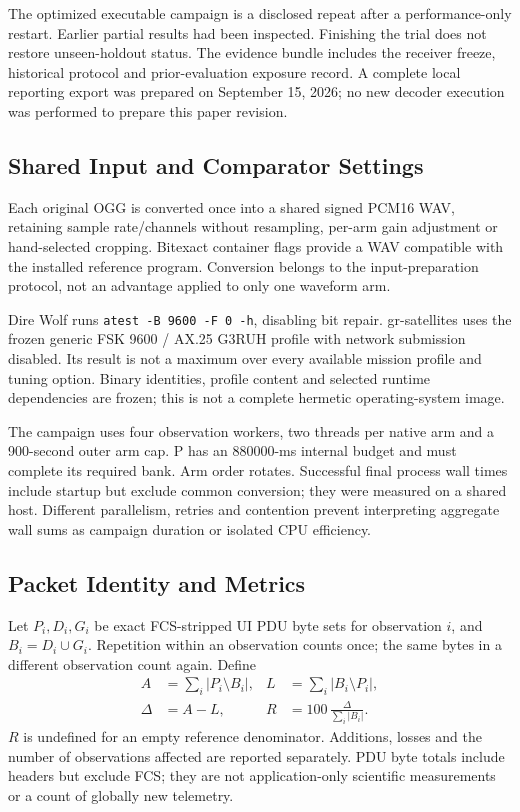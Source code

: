 \documentclass[journal]{IEEEtran}
\newcommand{\code}[1]{\texttt{#1}}
\begin{document}
The optimized executable campaign is a disclosed repeat after a performance-only restart. Earlier partial results had been inspected. Finishing the trial does not restore unseen-holdout status. The evidence bundle includes the receiver freeze, historical protocol and prior-evaluation exposure record. A complete local reporting export was prepared on September 15, 2026; no new decoder execution was performed to prepare this paper revision.

\subsection{Shared Input and Comparator Settings}
Each original OGG is converted once into a shared signed PCM16 WAV, retaining sample rate/channels without resampling, per-arm gain adjustment or hand-selected cropping. Bitexact container flags provide a WAV compatible with the installed reference program. Conversion belongs to the input-preparation protocol, not an advantage applied to only one waveform arm.

Dire Wolf runs \code{atest -B 9600 -F 0 -h}, disabling bit repair. gr-satellites uses the frozen generic FSK 9600 / AX.25 G3RUH profile with network submission disabled. Its result is not a maximum over every available mission profile and tuning option. Binary identities, profile content and selected runtime dependencies are frozen; this is not a complete hermetic operating-system image.

The campaign uses four observation workers, two threads per native arm and a 900-second outer arm cap. P has an 880000-ms internal budget and must complete its required bank. Arm order rotates. Successful final process wall times include startup but exclude common conversion; they were measured on a shared host. Different parallelism, retries and contention prevent interpreting aggregate wall sums as campaign duration or isolated CPU efficiency.

\subsection{Packet Identity and Metrics}
Let $P_i,D_i,G_i$ be exact FCS-stripped UI PDU byte sets for observation $i$, and $B_i=D_i\cup G_i$. Repetition within an observation counts once; the same bytes in a different observation count again. Define
\begin{align}
A&=\sum_i|P_i\setminus B_i|, & L&=\sum_i|B_i\setminus P_i|,\\
\Delta&=A-L, & R&=100\,\frac{\Delta}{\sum_i|B_i|}.
\label{eq:metrics}
\end{align}
$R$ is undefined for an empty reference denominator. Additions, losses and the number of observations affected are reported separately. PDU byte totals include headers but exclude FCS; they are not application-only scientific measurements or a count of globally new telemetry.
\end{document}
